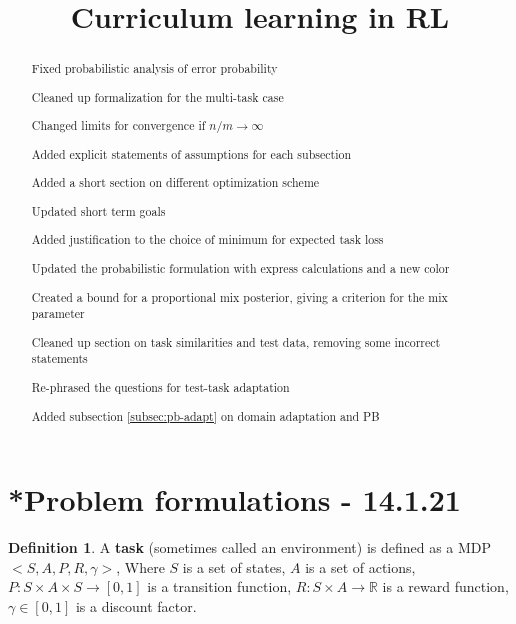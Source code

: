 \documentclass[letterpaper]{article}
\title{Curriculum learning in RL}
\theoremstyle{definition}
\newtheorem{defn}{Definition}[section]
\begin{document}
	
	\maketitle
	\begin{abstract}
		
		Fixed probabilistic analysis of error probability
		
		Cleaned up formalization for the multi-task case
		
		Changed limits for convergence if $n/m\rightarrow\infty$
		
		Added explicit statements of assumptions for each subsection
		
		Added a short section on different optimization scheme
		
		Updated short term goals
		
		Added justification to the choice of minimum for expected task loss
		
		Updated the probabilistic formulation with express calculations and a new color
		
		Created a bound for a proportional mix posterior, giving a criterion for the mix parameter
		
		Cleaned up section on task similarities and test data, removing some incorrect statements
		
		Re-phrased the questions for test-task adaptation
		
		Added subsection \ref{subsec:pb-adapt} on domain adaptation and PB
		
		
	\end{abstract}

\tableofcontents

\section{*Problem formulations - 14.1.21} \label{sec:formulation}
\begin{defn}
	A \textbf{task} (sometimes called an environment) is defined as a MDP $<S,A,P,R,\gamma>$,
	Where $S$ is a set of states, $A$ is a set of actions, $P:S\times A\times S\rightarrow [0,1]$ is a transition function, 
	$R:S\times A\rightarrow \mathbb{R}$ is a reward function, $\gamma\in[0,1]$ is a discount factor.
\end{defn}
\end{document}
